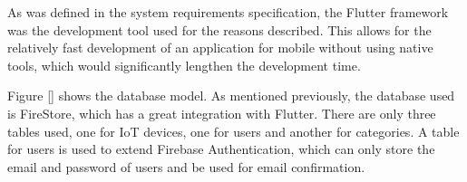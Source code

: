 As was defined in the system requirements specification, the Flutter
framework was the development tool used for the reasons described.
This allows for the relatively fast development of an application for
mobile without using native tools, which would significantly lengthen the
development time.

Figure \ref{} shows the database model. As mentioned previously, the database
used is FireStore, which has a great integration with Flutter. There are only
three tables used, one for IoT devices, one for users and another for categories.
A table for users is used to extend Firebase Authentication, which can only store
the email and password of users and be used for email confirmation.
